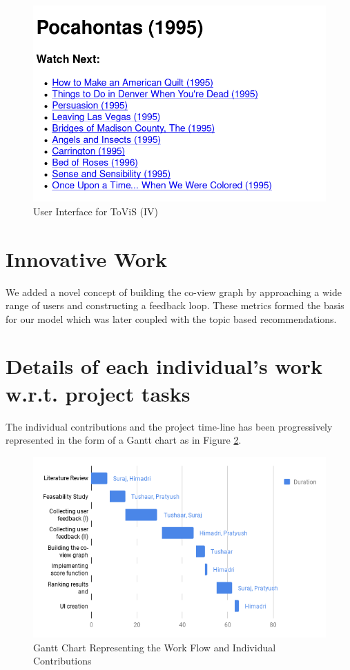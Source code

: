 \begin{figure}[htb]
\centering
\includegraphics[scale=0.35]{images/img4}
\caption{User Interface for ToViS (IV)}
\label{res:8}
\end{figure}


\section{Innovative Work}

We added a novel concept of building the co-view graph by approaching a wide range of users and constructing a feedback loop. These metrics formed the basis for our model which was later coupled with the topic based recommendations.

\section{Details of each individual's work w.r.t. project tasks}

The individual contributions and the project time-line has been progressively represented in the form of a Gantt chart as in Figure \ref{contr:1}.

\begin{figure}[htb]
\centering
\includegraphics[scale=0.7]{images/chart}
\caption{Gantt Chart Representing the Work Flow and Individual Contributions}
\label{contr:1}
\end{figure}